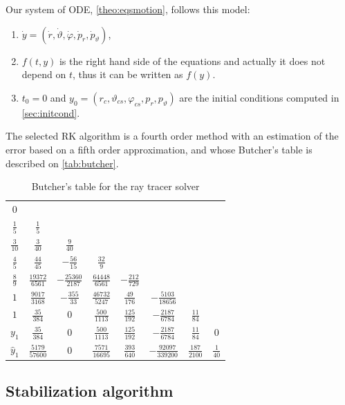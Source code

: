 Our system of \ac{ODE}, \autoref{theo:eqsmotion}, follows this model:
\begin{enumerate}
	\item $\dot{y} = (\dot{r}, \dot{\vartheta}, \dot{\varphi}, \dot{p}_r, \dot{p}_\vartheta)$,
	\item $f(t,y)$ is the right hand side of the equations and actually it does not depend on $t$, thus it can be written as $f(y)$.
	\item $t_0 = 0$ and $y_0 = (r_c, \vartheta_{cs}, \varphi_{cs}, p_{r}, p_{\vartheta})$ are the initial conditions computed in \autoref{sec:initcond}.
\end{enumerate}

The selected \ac{RK} algorithm is a fourth order method with an estimation of the error based on a fifth order approximation, and whose Butcher's table is described on \autoref{tab:butcher}.

\begin{table}[bth]
	\myfloatalign
	\begin{tabularx}{.9\textwidth}{c|ccccccc}
		$0$&  & & & & & & \\
		$\frac{1}{5}$&  $\frac{1}{5}$& & & & & & \\
		$\frac{3}{10}$&  $\frac{3}{40}$&  $\frac{9}{40}$& & & & & \\
		$\frac{4}{5}$&  $\frac{44}{45}$&  $-\frac{56}{15}$&  $\frac{32}{9}$& & & & \\
		$\frac{8}{9}$&  $\frac{19372}{6561}$&  $-\frac{25360}{2187}$&  $\frac{64448}{6561}$&  $-\frac{212}{729}$& & & \\
		$1$&  $\frac{9017}{3168}$&  $-\frac{355}{33}$&  $\frac{46732}{5247}$&  $\frac{49}{176}$&  $-\frac{5103}{18656}$& & \\
		$1$&  $\frac{35}{384}$&  $0$&  $\frac{500}{1113}$&  $\frac{125}{192}$&  $-\frac{2187}{6784}$&  $\frac{11}{84}$& \\ \hline
		$y_1$&  $\frac{35}{384}$&  $0$&  $\frac{500}{1113}$&  $\frac{125}{192}$&  $-\frac{2187}{6784}$&  $\frac{11}{84}$&  $0$ \\ \hline
		$\widehat{y}_1$&  $\frac{5179}{57600}$&  $0$&  $\frac{7571}{16695}$&  $\frac{393}{640}$&  $-\frac{92097}{339200}$&  $\frac{187}{2100}$&  $\frac{1}{40}$
	\end{tabularx}
	\caption{Butcher's table for the ray tracer solver}
	\label{tab:butcher}
\end{table}

\subsection{Stabilization algorithm}